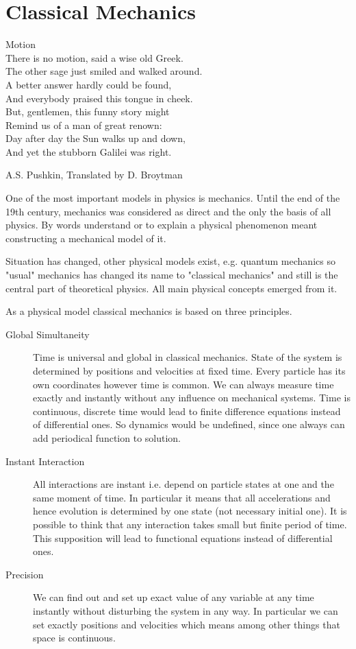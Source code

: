 \chapter{Classical Mechanics}
\label{class-mech}
{
\setlength{}
\epigraph {
    Motion\\
There is no motion, said a wise old Greek.\\
The other sage just smiled and walked around.\\
A better answer hardly could be found,\\
And everybody praised this tongue in cheek.\\
But, gentlemen, this funny story might\\
Remind us of a man of great renown:\\
Day after day the Sun walks up and down,\\
And yet the stubborn Galilei was right.
} {A.S. Pushkin, Translated by D. Broytman }
}

One of the most important models in physics is mechanics.
Until the end of the 19th century, mechanics was considered as direct and the only
the basis of all physics. By words understand or
to explain a physical phenomenon meant constructing a mechanical model of it.

Situation has changed,  other physical models exist, e.g. quantum mechanics so 
"usual" mechanics has changed its name to "classical mechanics" and still is
the central part of theoretical physics. All main physical concepts emerged from
it.

As a physical model classical mechanics is based on three principles.
\begin{description}
  \item[ Global Simultaneity] 
    Time is universal and global in classical mechanics. State of the system is determined by
    positions and velocities at fixed time. Every particle has its own coordinates however time
    is common. We can always measure time  exactly and instantly without any influence 
    on mechanical systems. Time is continuous, discrete time would lead to finite difference
    equations instead of differential ones. So dynamics would be undefined, since one always can
    add periodical function to solution.
  \item[ Instant Interaction]
    All interactions are instant i.e. depend on particle states at one and the same moment of time.
    In particular it means that all accelerations and hence evolution is determined by one state (not necessary initial one). It is possible to think that any interaction takes small but finite period of time. This supposition will lead to functional equations instead of differential ones.
  \item [ Precision]
    We can find out and set up exact value of any variable at any time instantly without disturbing
    the system in any way. In particular we can set exactly positions and velocities which means 
    among other things that space is continuous.
\end{description}

